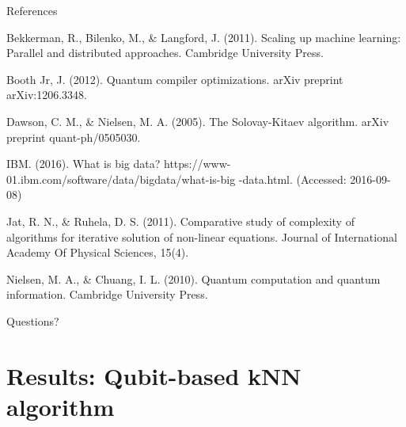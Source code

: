 \documentclass[10pt]{beamer}
\begin{document}
\begin{frame}{References}

\footnotesize{Bekkerman, R., Bilenko, M., \& Langford, J. (2011). Scaling up machine learning: Parallel and distributed
approaches. Cambridge University Press.\newline

Booth Jr, J. (2012). Quantum compiler optimizations. arXiv preprint arXiv:1206.3348.

Dawson, C. M., \& Nielsen, M. A. (2005). The Solovay-Kitaev algorithm. arXiv preprint quant-ph/0505030.\newline

IBM. (2016). What is big data? https://www-01.ibm.com/software/data/bigdata/what-is-big
-data.html. (Accessed: 2016-09-08) \newline

Jat, R. N., \& Ruhela, D. S. (2011). Comparative study of complexity of algorithms for iterative solution of non-linear equations. Journal of International Academy Of Physical Sciences, 15(4).\newline

Nielsen, M. A., \& Chuang, I. L. (2010). Quantum computation and quantum information. Cambridge University Press.}
\end{frame}

\begin{frame}[standout]
  Questions?
\end{frame}

\section{Results: Qubit-based kNN algorithm}

{
\begin{frame}[fragile]{}




\end{frame}
}
\end{document}
